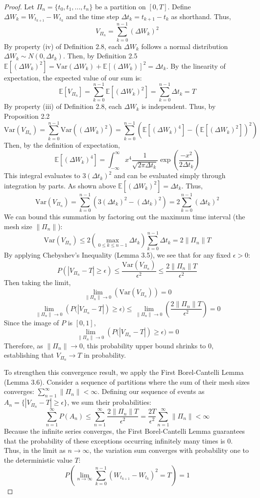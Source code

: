 \documentclass[12pt]{article}
\theoremstyle{definition}
\theoremstyle{plain}
\theoremstyle{remark}
\begin{document}
\begin{proof}
Let $\Pi_n = \{t_0,t_1,...,t_n\}$ be a partition on $[0,T]$.  Define $\Delta W_k = W_{t_{k+1}} - W_{t_k}$ and the time step $\Delta t_k = t_{k+1} - t_k$ as shorthand.  Thus,
\[
V_{\Pi_n} = \sum_{k=0}^{n-1} (\Delta W_k)^2
\]
By property (iv) of Definition 2.8, each $\Delta W_k$ follows a normal distribution $\Delta W_k \sim N(0, \Delta t_k)$.  Then, by Definition 2.5 $\mathbb{E}[(\Delta W_k)^2] = \mathrm{Var}(\Delta W_k) + \mathbb{E}[(\Delta W_k)]^2 = \Delta t_k$.  By the linearity of expectation, the expected value of our sum is:
\[
\mathbb{E}[V_{\Pi_n}] = \sum_{k=0}^{n-1} \mathbb{E}[(\Delta W_k)^2] = \sum_{k=0}^{n-1} \Delta t_k = T
\]
By property (iii) of Definition 2.8, each $\Delta W_k$ is independent. Thus, by Proposition 2.2
\[
\mathrm{Var}(V_{\Pi_n}) = \sum_{k=0}^{n-1} \mathrm{Var}\left((\Delta W_k)^2\right) = \sum_{k=0}^{n-1} \left( \mathbb{E}[(\Delta W_k)^4] - \left(\mathbb{E}[(\Delta W_k)^2]\right)^2 \right)
\]
Then, by the definition of expectation,
\[
\mathbb{E}[(\Delta W_k)^4] = \int_{-\infty}^\infty x^4\frac{1}{\sqrt{2\pi \Delta t _k}} \exp \left( \frac{-x^2}{2\Delta t _k} \right)
\]
This integral evaluates to $3 (\Delta t_k)^2$ and can be evaluated simply through integration by parts.  As shown above $\mathbb{E}[(\Delta W_k)^2] = \Delta t_k$.  Thus, 
\[
\mathrm{Var}(V_{\Pi_n}) = \sum_{k=0}^{n-1} \left( 3 (\Delta t_k)^2 - (\Delta t_k)^2 \right) = 2 \sum_{k=0}^{n-1} (\Delta t_k)^2
\]
We can bound this summation by factoring out the maximum time interval (the mesh size $\|\Pi_n\|$):
\[
\mathrm{Var}(V_{\Pi_n}) \leq 2 \left( \max_{0 \leq k \leq n-1} \Delta t_k \right) \sum_{k=0}^{n-1} \Delta t_k = 2 \|\Pi_n\| T
\]
By applying Chebyshev's Inequality (Lemma 3.5), we see that for any fixed $\epsilon > 0$:
\[
P(|V_{\Pi_n} - T| \geq \epsilon) \leq \frac{\mathrm{Var}(V_{\Pi_n})}{\epsilon^2} \leq \frac{2 \|\Pi_n\| T}{\epsilon^2}
\]
Then taking the limit,
\[
\lim_{\| \Pi_n \| \to 0} \left( \mathrm{Var}(V_{\Pi_n}) \right) = 0
\]
\[
\lim_{\| \Pi_n \| \to 0} \left( P(|V_{\Pi_n} - T| \right) \geq \epsilon) \leq  \lim_{\| \Pi_n \| \to 0} \left( \frac{2 \|\Pi_n\| T}{\epsilon^2} \right) = 0
\]
Since the image of $P$ is $[0,1]$,
\[
\lim_{\| \Pi_n \| \to 0} \left( P(|V_{\Pi_n} - T| \right) \geq \epsilon) = 0
\]
Therefore, as $\|\Pi_n\| \to 0$, this probability upper bound shrinks to $0$, establishing that $V_{\Pi_n} \to T$ in probability.

To strengthen this convergence result, we apply the First Borel-Cantelli Lemma (Lemma 3.6).  Consider a sequence of partitions where the sum of their mesh sizes converges: $\sum_{n=1}^\infty \|\Pi_n\| < \infty$. Defining our sequence of events as $A_n = \{ |V_{\Pi_n} - T| \geq \epsilon \}$, we sum their probabilities:
\[
\sum_{n=1}^\infty P(A_n) \leq \sum_{n=1}^\infty \frac{2 \|\Pi_n\| T}{\epsilon^2} = \frac{2T}{\epsilon^2} \sum_{n=1}^\infty \|\Pi_n\| < \infty
\]
Because the infinite series converges, the First Borel-Cantelli Lemma guarantees that the probability of these exceptions occurring infinitely many times is $0$. Thus, in the limit as $n \to \infty$, the variation sum converges with probability one to the deterministic value $T$:
\[
P\left(\lim_{n \to \infty} \sum_{k=0}^{n-1} (W_{t_{k+1}} - W_{t_k})^2 = T\right) = 1
\]


\end{proof}
\end{document}
